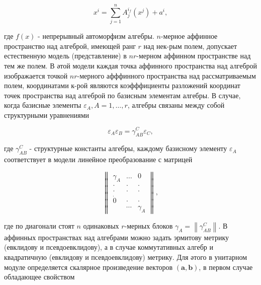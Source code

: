 \documentclass[10pt]{article}
\begin{document}
\[

x^{i}=\sum_{j=1}^{n} A_{j}^{i_{f}}\left(x^{j}\right)+a^{i},

\]



где $f(x)$ - непрерывный автоморфизм алгебры. $n$-мерное аффинное пространство над алгеброй, имеющей ранг $r$ над нек-рым полем, допускает естественную модель (представление) в $n r$-мерном аффинном пространстве над тем же полем. В әтой модели каждая точка аффинного пространства над алгеброй изображается точкой $n r$-мерного афффинного пространства над рассматриваемым полем, координатами к-рой являются коэфффициенты разложений координат точек пространства над алгеброй по базисным элементам алгебры. В случае, когда базисные элементы $\varepsilon_{A}, A=1, \ldots, r$, алгебры связаны между собой структурными уравнениями



\[

\varepsilon_{A} \varepsilon_{B}=\gamma_{A B}^{C} \varepsilon_{C},

\]



где $\gamma_{A B}^{C}$ - структурные константы алгебры, каждому базисному элементу $\varepsilon_{A}$ соответствует в модели линейное преобразование с матрицей



\[

\left\|\begin{array}{ccc}

\gamma_{A} & \ldots & 0 \\

\cdot & \cdot & \cdot \\

\cdot & \cdot & \cdot \\

\dot{0} & \cdot & \cdot \\

& \cdots & \gamma_{A}

\end{array}\right\|,

\]



где по диагонали стоят $n$ одинаковых $r$-мерных блоков $\gamma_{A}=\left\|\gamma_{A B}^{C}\right\|$. В аффинных пространствах над алгебрами можно задать эрмитову метрику (евклидову и псевдоевклидову), а в случае коммутативных алгебр и квадратичную (евклидову и псевдоевклидову) метрику. Для әтого в унитарном модуле определяется скалярное произведение векторов $(\boldsymbol{a}, \boldsymbol{b})$, в первом случае обладающее свойством
\end{document}
